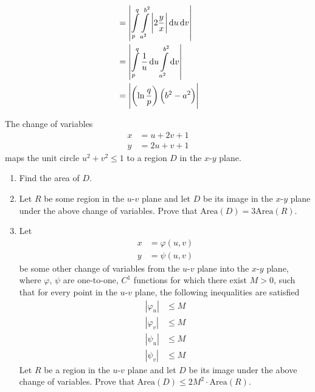 \documentclass[fleqn, a4paper, 11pt, oneside]{amsart}
\theoremstyle{definition}
\theoremstyle{theorem}
\begin{document}
\begin{solution}
\begin{align*}
                                                              & = \left| \int\limits_{p}^{q} \int\limits_{a^2}^{b^2} \left| 2 \frac{y}{x} \right| \dif u \dif v \right| \\
                                                              & = \left| \int\limits_{p}^{q} \frac{1}{u} \dif u \int\limits_{a^2}^{b^2} \dif v \right|                  \\
                                                              & = \left| \left( \ln \frac{q}{p} \right) \left( b^2 - a^2 \right) \right|
	\end{align*}
\end{solution}

\begin{question}
	The change of variables
	\begin{align*}
		x & = u + 2 v + 1 \\
		y & = 2 u + v + 1
	\end{align*}
	maps the unit circle $u^2 + v^2 \le 1$ to a region $D$ in the $x$-$y$ plane.
	\begin{enumerate}
		\item Find the area of $D$.
		\item 
			Let $R$ be some region in the $u$-$v$ plane and let $D$ be its image in the $x$-$y$ plane under the above change of variables.
			Prove that $\mathrm{Area}(D) = 3 \mathrm{Area}(R)$.
		\item
			Let
			\begin{align*}
				x &= \varphi(u,v)\\
				y &= \psi(u,v)
			\end{align*}
			be some other change of variables from the $u$-$v$ plane into the $x$-$y$ plane, where $\varphi$, $\psi$ are one-to-one, $C^1$ functions for which there exist $M > 0$, such that for every point in the $u$-$v$ plane, the following inequalities are satisfied
			\begin{align*}
				|\varphi_u| & \le M \\
				|\varphi_v| & \le M \\
				|\psi_u|    & \le M \\
				|\psi_v|    & \le M
			\end{align*}
			Let $R$ be a region in the $u$-$v$ plane and let $D$ be its image under the above change of variables.
			Prove that $\mathrm{Area}(D) \le 2 M^2 \cdot \mathrm{Area}(R)$.
	\end{enumerate}
\end{question}
\end{document}
